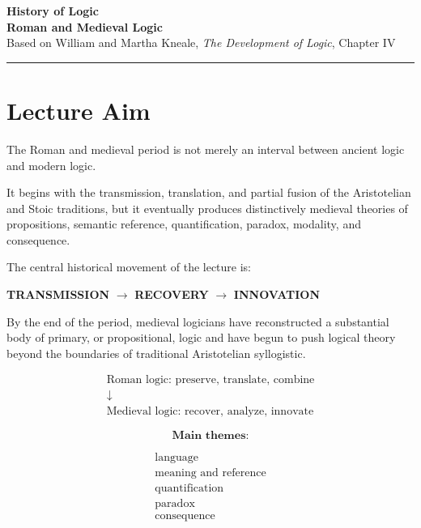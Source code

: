 \documentclass[11pt]{article}
\begin{document}
\begin{center}
    {\LARGE \textbf{History of Logic}}\\[0.4em]
    {\Large \textbf{Roman and Medieval Logic}}\\[0.6em]
    {\normalsize Based on William and Martha Kneale,
    \textit{The Development of Logic}, Chapter IV}
\end{center}

\vspace{0.5em}
\hrule
\vspace{0.8em}


\section*{Lecture Aim}

The Roman and medieval period is not merely an interval between
ancient logic and modern logic.

It begins with the transmission, translation, and partial fusion
of the Aristotelian and Stoic traditions, but it eventually
produces distinctively medieval theories of propositions,
semantic reference, quantification, paradox, modality, and
consequence.

The central historical movement of the lecture is:

\begin{center}
\textbf{TRANSMISSION}
\(\longrightarrow\)
\textbf{RECOVERY}
\(\longrightarrow\)
\textbf{INNOVATION}
\end{center}

By the end of the period, medieval logicians have reconstructed a
substantial body of primary, or propositional, logic and have
begun to push logical theory beyond the boundaries of traditional
Aristotelian syllogistic.

\begin{whiteboard}
\[
\boxed{
\begin{array}{c}
\text{Roman logic: preserve, translate, combine}\\
\downarrow\\
\text{Medieval logic: recover, analyze, innovate}
\end{array}
}
\]

\[
\textbf{Main themes:}
\]

\[
\begin{array}{c}
\text{language}\\
\text{meaning and reference}\\
\text{quantification}\\
\text{paradox}\\
\text{consequence}
\end{array}
\]
\end{whiteboard}
\end{document}
